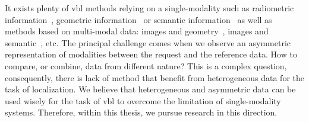 	It exists plenty of \ac{vbl} methods relying on a single-modality such as radiometric information~\citep{Liu2018, Radenovic2017}, geometric information~\citep{Uy2018, Yew2018} or semantic information~\citep{Ardeshir2014} as well as methods based on multi-modal data: images and geometry~\citep{Schonberger2017a}, images and semantic~\citep{Arandjelovic2014a}, etc. The principal challenge comes when we observe an asymmetric representation of modalities between the request and the reference data. How to compare, or combine, data from different nature? This is a complex question, consequently, there is lack of method that benefit from heterogeneous data for the task of localization. We believe that heterogeneous and asymmetric data can be used wisely for the task of \acl{vbl} to overcome the limitation of single-modality systems. Therefore, within this thesis, we pursue research in this direction.